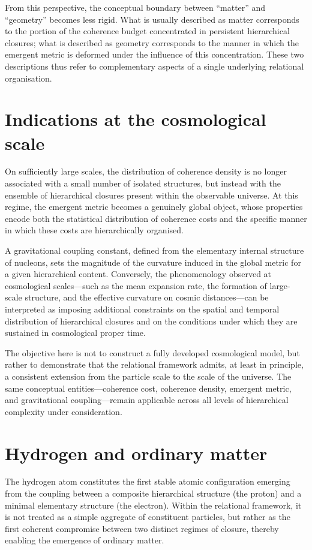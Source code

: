 \documentclass[11pt,a4paper]{article}
\begin{document}
From this perspective, the conceptual boundary between “matter” and “geometry” becomes less rigid. What is usually described as matter corresponds to the portion of the coherence budget concentrated in persistent hierarchical closures; what is described as geometry corresponds to the manner in which the emergent metric is deformed under the influence of this concentration. These two descriptions thus refer to complementary aspects of a single underlying relational organisation.

\section{Indications at the cosmological scale}

On sufficiently large scales, the distribution of coherence density is no longer associated with a small number of isolated structures, but instead with the ensemble of hierarchical closures present within the observable universe. At this regime, the emergent metric becomes a genuinely global object, whose properties encode both the statistical distribution of coherence costs and the specific manner in which these costs are hierarchically organised.

A gravitational coupling constant, defined from the elementary internal structure of nucleons, sets the magnitude of the curvature induced in the global metric for a given hierarchical content. Conversely, the phenomenology observed at cosmological scales—such as the mean expansion rate, the formation of large-scale structure, and the effective curvature on cosmic distances—can be interpreted as imposing additional constraints on the spatial and temporal distribution of hierarchical closures and on the conditions under which they are sustained in cosmological proper time.

The objective here is not to construct a fully developed cosmological model, but rather to demonstrate that the relational framework admits, at least in principle, a consistent extension from the particle scale to the scale of the universe. The same conceptual entities—coherence cost, coherence density, emergent metric, and gravitational coupling—remain applicable across all levels of hierarchical complexity under consideration.

\section{Hydrogen and ordinary matter}
The hydrogen atom constitutes the first stable atomic configuration emerging from the coupling between a composite hierarchical structure (the proton) and a minimal elementary structure (the electron). Within the relational framework, it is not treated as a simple aggregate of constituent particles, but rather as the first coherent compromise between two distinct regimes of closure, thereby enabling the emergence of ordinary matter.
\end{document}
